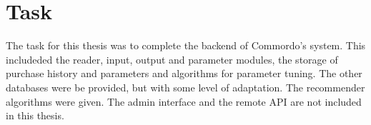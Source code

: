 
\section{Task}\label{sec:task}

The task for this thesis was to complete the backend of Commordo's system. This includeded the reader, input, output and parameter modules, the storage of purchase history and parameters and algorithms for parameter tuning. The other databases were be provided, but with some level of adaptation. The recommender algorithms were given. The admin interface and the remote API are not included in this thesis.

